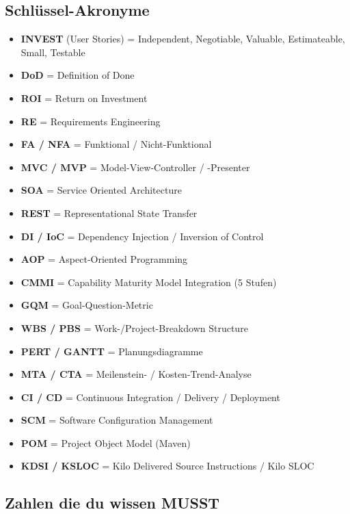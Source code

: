 \documentclass[11pt,a4paper]{article}
\begin{document}
\subsection{Schlüssel-Akronyme}

\begin{keyfacts}
\begin{itemize}
  \item \textbf{INVEST} (User Stories) = Independent, Negotiable, Valuable, Estimateable, Small, Testable
  \item \textbf{DoD} = Definition of Done
  \item \textbf{ROI} = Return on Investment
  \item \textbf{RE} = Requirements Engineering
  \item \textbf{FA / NFA} = Funktional / Nicht-Funktional
  \item \textbf{MVC / MVP} = Model-View-Controller / -Presenter
  \item \textbf{SOA} = Service Oriented Architecture
  \item \textbf{REST} = Representational State Transfer
  \item \textbf{DI / IoC} = Dependency Injection / Inversion of Control
  \item \textbf{AOP} = Aspect-Oriented Programming
  \item \textbf{CMMI} = Capability Maturity Model Integration (5 Stufen)
  \item \textbf{GQM} = Goal-Question-Metric
  \item \textbf{WBS / PBS} = Work-/Project-Breakdown Structure
  \item \textbf{PERT / GANTT} = Planungsdiagramme
  \item \textbf{MTA / CTA} = Meilenstein- / Kosten-Trend-Analyse
  \item \textbf{CI / CD} = Continuous Integration / Delivery / Deployment
  \item \textbf{SCM} = Software Configuration Management
  \item \textbf{POM} = Project Object Model (Maven)
  \item \textbf{KDSI / KSLOC} = Kilo Delivered Source Instructions / Kilo SLOC
\end{itemize}
\end{keyfacts}

\subsection{Zahlen die du wissen MUSST}
\end{document}
